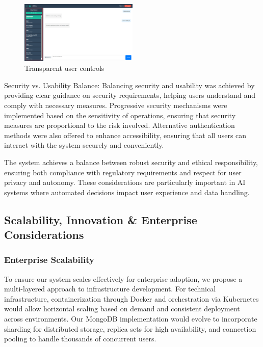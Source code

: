 \documentclass{article}
\begin{document}
\begin{figure}[htb]
    \centering
    \includegraphics[width=0.5\textwidth]{images/Transparent user controls.png}
    \caption{Transparent user controls}
    \label{fig:transparent_user_controls}
\end{figure}

Security vs. Usability Balance: Balancing security and usability was achieved by providing clear guidance on security requirements, helping users understand and comply with necessary measures. Progressive security mechanisms were implemented based on the sensitivity of operations, ensuring that security measures are proportional to the risk involved. Alternative authentication methods were also offered to enhance accessibility, ensuring that all users can interact with the system securely and conveniently.

The system achieves a balance between robust security and ethical responsibility, ensuring both compliance with regulatory requirements and respect for user privacy and autonomy. These considerations are particularly important in AI systems where automated decisions impact user experience and data handling.



\subsection{Scalability, Innovation \& Enterprise Considerations}

\subsubsection{Enterprise Scalability}
To ensure our system scales effectively for enterprise adoption, we propose a multi-layered approach to infrastructure development. For technical infrastructure, containerization through Docker and orchestration via Kubernetes would allow horizontal scaling based on demand and consistent deployment across environments. Our MongoDB implementation would evolve to incorporate sharding for distributed storage, replica sets for high availability, and connection pooling to handle thousands of concurrent users.
\end{document}
